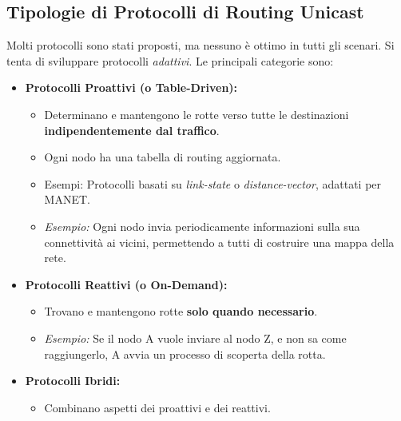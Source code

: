 \subsection{Tipologie di Protocolli di Routing Unicast}
Molti protocolli sono stati proposti, ma nessuno è ottimo in tutti gli scenari. Si tenta di sviluppare protocolli \textit{adattivi}.
Le principali categorie sono:
\begin{itemize}
    \item \textbf{Protocolli Proattivi (o Table-Driven):}
    \begin{itemize}
        \item Determinano e mantengono le rotte verso tutte le destinazioni \textbf{indipendentemente dal traffico}.
        \item Ogni nodo ha una tabella di routing aggiornata.
        \item Esempi: Protocolli basati su \textit{link-state} o \textit{distance-vector}, adattati per MANET.
        \item \textit{Esempio:} Ogni nodo invia periodicamente informazioni sulla sua connettività ai vicini, permettendo a tutti di costruire una mappa della rete.
    \end{itemize}
    \item \textbf{Protocolli Reattivi (o On-Demand):}
    \begin{itemize}
        \item Trovano e mantengono rotte \textbf{solo quando necessario}.
        \item \textit{Esempio:} Se il nodo A vuole inviare al nodo Z, e non sa come raggiungerlo, A avvia un processo di scoperta della rotta.
    \end{itemize}
    \item \textbf{Protocolli Ibridi:}
    \begin{itemize}
        \item Combinano aspetti dei proattivi e dei reattivi.
    \end{itemize}
\end{itemize}

